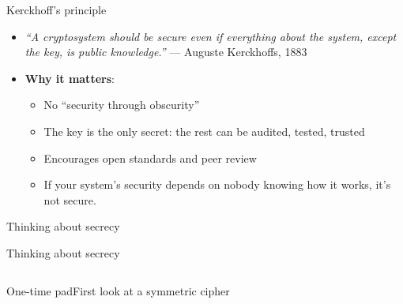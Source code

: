 \documentclass[aspectratio=169, lualatex, handout]{beamer}
\begin{document}
\begin{frame}{Kerckhoff's principle}
	\begin{itemize}[<+->]
		\item \textit{``A cryptosystem should be secure even if everything about the system, except the key, is public knowledge.''} — Auguste Kerckhoffs, 1883
		\item \textbf{Why it matters}:
		      \begin{itemize}[<+->]
			      \item No ``security through obscurity''
			      \item The key is the only secret: the rest can be audited, tested, trusted
			      \item Encourages open standards and peer review
			      \item If your system's security depends on nobody knowing how it works, it's not secure.
		      \end{itemize}
	\end{itemize}
\end{frame}

\begin{frame}{Thinking about secrecy}
\end{frame}

\begin{frame}{Thinking about secrecy}
	\begin{columns}[c]
	\end{columns}
\end{frame}

\begin{frame}{One-time pad}{First look at a symmetric cipher}
	\begin{columns}[c]
		\begin{column}{0.5\textwidth}
		\end{column}
		\begin{column}{0.5\textwidth}
		\end{column}
	\end{columns}
\end{frame}
\end{document}
